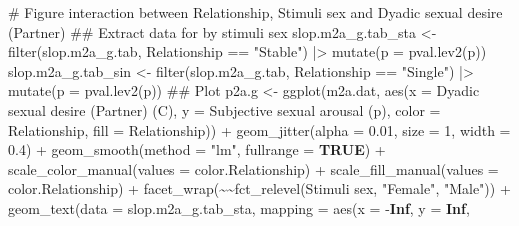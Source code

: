 \documentclass[
  bookmarksnumbered]{article}
\newenvironment{Shaded}{\begin{snugshade}}{\end{snugshade}}
\newcommand{\AttributeTok}[1]{\textcolor[rgb]{0.80,0.80,0.80}{#1}}
\newcommand{\CommentTok}[1]{\textcolor[rgb]{0.50,0.62,0.50}{#1}}
\newcommand{\ConstantTok}[1]{\textcolor[rgb]{0.86,0.64,0.64}{\textbf{#1}}}
\newcommand{\DecValTok}[1]{\textcolor[rgb]{0.86,0.86,0.80}{#1}}
\newcommand{\DocumentationTok}[1]{\textcolor[rgb]{0.50,0.62,0.50}{#1}}
\newcommand{\ErrorTok}[1]{\textcolor[rgb]{0.76,0.75,0.62}{#1}}
\newcommand{\FloatTok}[1]{\textcolor[rgb]{0.75,0.75,0.82}{#1}}
\newcommand{\FunctionTok}[1]{\textcolor[rgb]{0.94,0.94,0.56}{#1}}
\newcommand{\NormalTok}[1]{\textcolor[rgb]{0.80,0.80,0.80}{#1}}
\newcommand{\OtherTok}[1]{\textcolor[rgb]{0.94,0.94,0.56}{#1}}
\newcommand{\SpecialCharTok}[1]{\textcolor[rgb]{0.86,0.64,0.64}{#1}}
\newcommand{\StringTok}[1]{\textcolor[rgb]{0.80,0.58,0.58}{#1}}
\begin{document}
\begin{Shaded}
\begin{Highlighting}[]
\CommentTok{\# Figure interaction between Relationship, Stimuli sex and Dyadic sexual desire (Partner)}
\DocumentationTok{\#\# Extract data for by stimuli sex}
\NormalTok{slop.m2a\_g.tab\_sta }\OtherTok{\textless{}{-}} \FunctionTok{filter}\NormalTok{(slop.m2a\_g.tab, Relationship }\SpecialCharTok{==} \StringTok{"Stable"}\NormalTok{) }\SpecialCharTok{|\textgreater{}}
  \FunctionTok{mutate}\NormalTok{(}\AttributeTok{p =} \FunctionTok{pval.lev2}\NormalTok{(p))}
\NormalTok{slop.m2a\_g.tab\_sin }\OtherTok{\textless{}{-}} \FunctionTok{filter}\NormalTok{(slop.m2a\_g.tab, Relationship }\SpecialCharTok{==} \StringTok{"Single"}\NormalTok{) }\SpecialCharTok{|\textgreater{}}
  \FunctionTok{mutate}\NormalTok{(}\AttributeTok{p =} \FunctionTok{pval.lev2}\NormalTok{(p))}
\DocumentationTok{\#\# Plot}
\NormalTok{p2a.g }\OtherTok{\textless{}{-}} \FunctionTok{ggplot}\NormalTok{(m2a.dat, }\FunctionTok{aes}\NormalTok{(}\AttributeTok{x =} \StringTok{\textasciigrave{}}\AttributeTok{Dyadic sexual desire (Partner) (C)}\StringTok{\textasciigrave{}}\NormalTok{,}
                             \AttributeTok{y =} \StringTok{\textasciigrave{}}\AttributeTok{Subjective sexual arousal (p)}\StringTok{\textasciigrave{}}\NormalTok{,}
                             \AttributeTok{color =}\NormalTok{ Relationship, }\AttributeTok{fill =}\NormalTok{ Relationship)) }\SpecialCharTok{+}
  \FunctionTok{geom\_jitter}\NormalTok{(}\AttributeTok{alpha =} \FloatTok{0.01}\NormalTok{, }\AttributeTok{size =} \DecValTok{1}\NormalTok{, }\AttributeTok{width =} \FloatTok{0.4}\NormalTok{) }\SpecialCharTok{+}
  \FunctionTok{geom\_smooth}\NormalTok{(}\AttributeTok{method =} \StringTok{"lm"}\NormalTok{, }\AttributeTok{fullrange =} \ConstantTok{TRUE}\NormalTok{) }\SpecialCharTok{+}
  \FunctionTok{scale\_color\_manual}\NormalTok{(}\AttributeTok{values =}\NormalTok{ color.Relationship) }\SpecialCharTok{+}
  \FunctionTok{scale\_fill\_manual}\NormalTok{(}\AttributeTok{values =}\NormalTok{ color.Relationship) }\SpecialCharTok{+}
  \FunctionTok{facet\_wrap}\NormalTok{(}\SpecialCharTok{\textasciitilde{}}\ErrorTok{\textasciitilde{}}\FunctionTok{fct\_relevel}\NormalTok{(}\StringTok{\textasciigrave{}}\AttributeTok{Stimuli sex}\StringTok{\textasciigrave{}}\NormalTok{, }\StringTok{"Female"}\NormalTok{, }\StringTok{"Male"}\NormalTok{)) }\SpecialCharTok{+}
  \FunctionTok{geom\_text}\NormalTok{(}\AttributeTok{data =}\NormalTok{ slop.m2a\_g.tab\_sta,}
            \AttributeTok{mapping =} \FunctionTok{aes}\NormalTok{(}\AttributeTok{x =} \SpecialCharTok{{-}}\ConstantTok{Inf}\NormalTok{, }\AttributeTok{y =} \ConstantTok{Inf}\NormalTok{,}

\end{Highlighting}
\end{Shaded}
\end{document}
